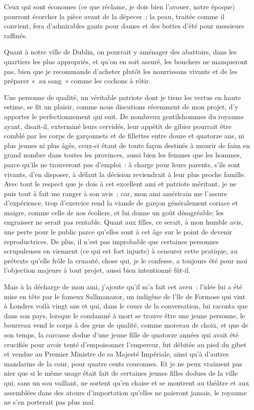 \documentclass[french,twoside]{book} %
\begin{document}
Ceux qui sont économes (ce que réclame, je dois bien l’avouer, notre époque) pourront écorcher la pièce avant de la dépecer ; la peau, traitée comme il convient, fera d’admirables gants pour dames et des bottes d’été pour messieurs raffinés.\par
Quant à notre ville de Dublin, on pourrait y aménager des abattoirs, dans les quartiers les plus appropriés, et qu’on en soit assuré, les bouchers ne manqueront pas, bien que je recommande d’acheter plutôt les nourrissons vivants et de les préparer « au sang » comme les cochons à rôtir.\par
Une personne de qualité, un véritable patriote dont je tiens les vertus en haute estime, se fit un plaisir, comme nous discutions récemment de mon projet, d’y apporter le perfectionnement qui suit. De nombreux gentilshommes du royaume ayant, disait-il, exterminé leurs cervidés, leur appétit de gibier pourrait être comblé par les corps de garçonnets et de fillettes entre douze et quatorze ans, ni plus jeunes ni plus âgés, ceux-ci étant de toute façon destinés à mourir de faim en grand nombre dans toutes les provinces, aussi bien les femmes que les hommes, parce qu’ils ne trouveront pas d’emploi : à charge pour leurs parents, s’ils sont vivants, d’en disposer, à défaut la décision reviendrait à leur plus proche famille. Avec tout le respect que je dois à cet excellent ami et patriote méritant, je ne puis tout à fait me ranger à son avis ; car, mon ami américain me l’assure d’expérience, trop d’exercice rend la viande de garçon généralement coriace et maigre, comme celle de nos écoliers, et lui donne un goût désagréable; les engraisser ne serait pas rentable. Quant aux filles, ce serait, à mon humble avis, une perte pour le public parce qu’elles sont à cet âge sur le point de devenir reproductrices. De plus, il n’est pas improbable que certaines personnes scrupuleuses en viennent (ce qui est fort injuste) à censurer cette pratique, au prétexte qu’elle frôle la cruauté, chose qui, je le confesse, a toujours été pour moi l’objection majeure à tout projet, aussi bien intentionné fût-il.\par
Mais à la décharge de mon ami, j’ajoute qu’il m’a fait cet aveu : l’idée lui a été mise en tête par le fameux Sallmanazor, un indigène de l’île de Formose qui vint à Londres voilà vingt ans et qui, dans le cours de la conversation, lui raconta que dans son pays, lorsque le condamné à mort se trouve être une jeune personne, le bourreau vend le corps à des gens de qualité, comme morceau de choix, et que de son temps, la carcasse dodue d’une jeune fille de quatorze années qui avait été crucifiée pour avoir tenté d’empoisonner l’empereur, fut débitée au pied du gibet et vendue au Premier Ministre de sa Majesté Impériale, ainsi qu’à d’autres mandarins de la cour, pour quatre cents couronnes. Et je ne peux vraiment pas nier que si le même usage était fait de certaines jeunes filles dodues de la ville qui, sans un sou vaillant, ne sortent qu’en chaise et se montrent au théâtre et aux assemblées dans des atours d’importation qu’elles ne paieront jamais, le royaume ne s’en porterait pas plus mal.\par
\end{document}
